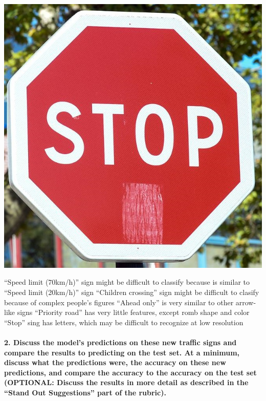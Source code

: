 \documentclass[11pt]{article}
\makeatletter
\def\maxwidth{\ifdim\Gin@nat@width>\linewidth\linewidth
    \else\Gin@nat@width\fi}
\let\Oldincludegraphics\includegraphics
\renewcommand{\includegraphics}[1]{\Oldincludegraphics[width=.8\maxwidth]{#1}}
\makeatother
\begin{document}
\includegraphics{sign examples/image5.jpg}

``Speed limit (70km/h)'' sign might be difficult to classify because is
similar to ``Speed limit (20km/h)'' sign ``Children crossing'' sign
might be difficult to clasify because of complex people's figures
``Ahead only'' is very similar to other arrow-like signs ``Priority
road'' has very little features, except romb shape and color ``Stop''
sing has letters, which may be difficult to recognize at low resolution

    \hypertarget{discuss-the-models-predictions-on-these-new-traffic-signs-and-compare-the-results-to-predicting-on-the-test-set.-at-a-minimum-discuss-what-the-predictions-were-the-accuracy-on-these-new-predictions-and-compare-the-accuracy-to-the-accuracy-on-the-test-set-optional-discuss-the-results-in-more-detail-as-described-in-the-stand-out-suggestions-part-of-the-rubric.}{%
\paragraph{2. Discuss the model's predictions on these new traffic signs
and compare the results to predicting on the test set. At a minimum,
discuss what the predictions were, the accuracy on these new
predictions, and compare the accuracy to the accuracy on the test set
(OPTIONAL: Discuss the results in more detail as described in the
``Stand Out Suggestions'' part of the
rubric).}\label{discuss-the-models-predictions-on-these-new-traffic-signs-and-compare-the-results-to-predicting-on-the-test-set.-at-a-minimum-discuss-what-the-predictions-were-the-accuracy-on-these-new-predictions-and-compare-the-accuracy-to-the-accuracy-on-the-test-set-optional-discuss-the-results-in-more-detail-as-described-in-the-stand-out-suggestions-part-of-the-rubric.}}
\end{document}
